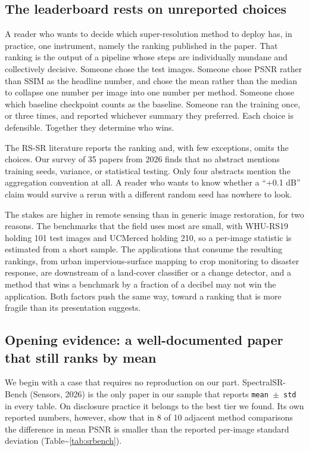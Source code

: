 \documentclass[pdflatex,sn-nature]{sn-jnl}
\begin{document}
\subsection{The leaderboard rests on unreported choices}\label{sec:unreported}

A reader who wants to decide which super-resolution method to deploy has, in practice, one instrument, namely the ranking published in the paper. That ranking is the output of a pipeline whose steps are individually mundane and collectively decisive. Someone chose the test images. Someone chose PSNR rather than SSIM as the headline number, and chose the mean rather than the median to collapse one number per image into one number per method. Someone chose which baseline checkpoint counts as the baseline. Someone ran the training once, or three times, and reported whichever summary they preferred. Each choice is defensible. Together they determine who wins.

The RS-SR literature reports the ranking and, with few exceptions, omits the choices. Our survey of 35 papers from 2026 finds that no abstract mentions training seeds, variance, or statistical testing. Only four abstracts mention the aggregation convention at all. A reader who wants to know whether a ``+0.1 dB'' claim would survive a rerun with a different random seed has nowhere to look.

The stakes are higher in remote sensing than in generic image restoration, for two reasons. The benchmarks that the field uses most are small, with WHU-RS19 holding 101 test images and UCMerced holding 210, so a per-image statistic is estimated from a short sample. The applications that consume the resulting rankings, from urban impervious-surface mapping to crop monitoring to disaster response, are downstream of a land-cover classifier or a change detector, and a method that wins a benchmark by a fraction of a decibel may not win the application. Both factors push the same way, toward a ranking that is more fragile than its presentation suggests.

\subsection{Opening evidence: a well-documented paper that still ranks by mean}\label{sec:opening}

We begin with a case that requires no reproduction on our part. SpectralSR-Bench (Sensors, 2026) is the only paper in our sample that reports \texttt{mean $\pm$ std} in every table. On disclosure practice it belongs to the best tier we found. Its own reported numbers, however, show that in 8 of 10 adjacent method comparisons the difference in mean PSNR is smaller than the reported per-image standard deviation (Table\textasciitilde{}\ref{tab:srbench}).
\end{document}
